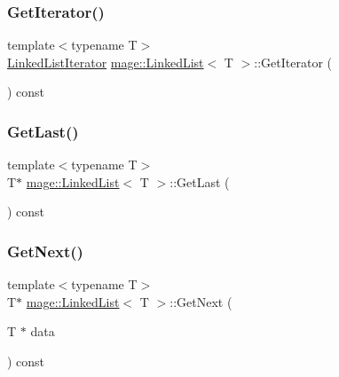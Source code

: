 \hypertarget{classmage_1_1_linked_list_a7e4016d051e44eb5d8a7bde3d193b9e8}{}\label{classmage_1_1_linked_list_a7e4016d051e44eb5d8a7bde3d193b9e8} 
\subsubsection{\texorpdfstring{Get\+Iterator()}{GetIterator()}}
{\footnotesize\ttfamily template$<$typename T$>$ \\
\hyperlink{structmage_1_1_linked_list_1_1_linked_list_iterator}{Linked\+List\+Iterator} \hyperlink{classmage_1_1_linked_list}{mage\+::\+Linked\+List}$<$ T $>$\+::Get\+Iterator (\begin{DoxyParamCaption}{ }\end{DoxyParamCaption}) const}

\hypertarget{classmage_1_1_linked_list_a734f6dc6d073edd99eb9a0ac1f605900}{}\label{classmage_1_1_linked_list_a734f6dc6d073edd99eb9a0ac1f605900} 
\subsubsection{\texorpdfstring{Get\+Last()}{GetLast()}}
{\footnotesize\ttfamily template$<$typename T$>$ \\
T$\ast$ \hyperlink{classmage_1_1_linked_list}{mage\+::\+Linked\+List}$<$ T $>$\+::Get\+Last (\begin{DoxyParamCaption}{ }\end{DoxyParamCaption}) const}

\hypertarget{classmage_1_1_linked_list_a992390dbc48cf24705f9e79baef37061}{}\label{classmage_1_1_linked_list_a992390dbc48cf24705f9e79baef37061} 
\subsubsection{\texorpdfstring{Get\+Next()}{GetNext()}}
{\footnotesize\ttfamily template$<$typename T$>$ \\
T$\ast$ \hyperlink{classmage_1_1_linked_list}{mage\+::\+Linked\+List}$<$ T $>$\+::Get\+Next (\begin{DoxyParamCaption}\item[{T $\ast$}]{data }\end{DoxyParamCaption}) const}

